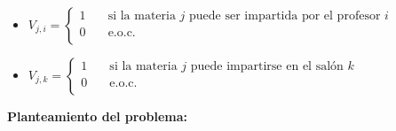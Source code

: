 \documentclass[12pt,spanish]{report}
\begin{document}
\begin{itemize}
\item[ ] $ V_{j,i} =
  \begin{cases}
    1  & \quad \text{si la materia } j \text{ puede ser impartida por  el profesor } i \\
    0  & \quad \text{e.o.c. } \\
  \end{cases}
$

\item[ ] $ V_{j,k} =
  \begin{cases}
    1  & \quad \text{si la materia } j \text{ puede impartirse en el salón } k \\
    0  & \quad \text{e.o.c. } \\
  \end{cases}
$

\end{itemize}

\begin{flushleft}
\textbf{Planteamiento del problema:}
\end{flushleft}
\end{document}
